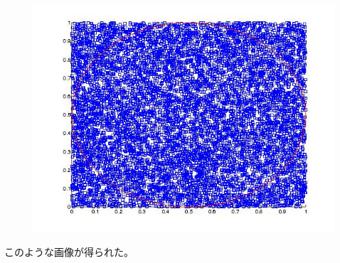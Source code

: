 \begin{figure}[htpb]
	\begin{center}
		\includegraphics[width=13cm]{1/img/hoge.png}
	\end{center}
\end{figure}

このような画像が得られた。
